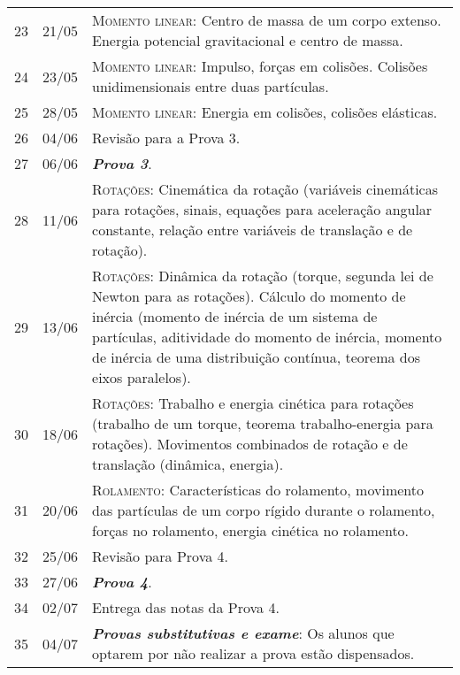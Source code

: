 \begin{center}
\begin{longtable}{ccp{70mm}}
23	 & 	21/05	 & 	\textsc{Momento linear:} Centro de massa de um corpo extenso. Energia potencial gravitacional e centro de massa. \\
24	 & 	23/05	 & 	\textsc{Momento linear:} Impulso, forças em colisões. Colisões unidimensionais entre duas partículas. \\
25	 & 	28/05	 & 	\textsc{Momento linear:} Energia em colisões, colisões elásticas. \\
26	 & 	04/06	 & 	Revisão para a Prova 3. \\
27	 & 	06/06	 & 	\textbf{\textit{Prova 3}}. \\
28	 &  11/06	 & 	\textsc{Rotações:} Cinemática da rotação (variáveis cinemáticas para rotações, sinais, equações para aceleração angular constante, relação entre variáveis de translação e de rotação). \\
29	 & 	13/06	 & 	\textsc{Rotações:} Dinâmica da rotação (torque, segunda lei de Newton para as rotações). Cálculo do momento de inércia (momento de inércia de um sistema de partículas, aditividade do momento de inércia, momento de inércia de uma distribuição contínua, teorema dos eixos paralelos). \\
30	 & 	18/06	 & 	\textsc{Rotações:} Trabalho e energia cinética para rotações (trabalho de um torque, teorema trabalho-energia para rotações). Movimentos combinados de rotação e de translação (dinâmica, energia). \\
31	 & 	20/06	 & 	\textsc{Rolamento:} Características do rolamento, movimento das partículas de um corpo rígido durante o rolamento, forças no rolamento, energia cinética no rolamento. \\
32	 & 	25/06	 & 	Revisão para Prova 4. \\
33	 & 	27/06	 & 	\textbf{\textit{Prova 4}}. \\
34	 & 	02/07	 & 	Entrega das notas da Prova 4. \\
35   &  04/07    &  \textbf{\textit{Provas substitutivas e exame}}: Os alunos que optarem por não realizar a prova estão dispensados.
\end{longtable}
\end{center}


\cleardoublepage

